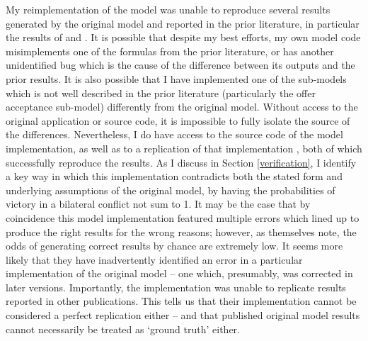 My reimplementation of the model was unable to reproduce several results generated by the original model and reported in the prior literature, in particular the results of \citet{bdm_1994} and \citet[chapter 6]{bdm_2002}. It is possible that despite my best efforts, my own model code misimplements one of the formulas from the prior literature, or has another unidentified bug which is the cause of the difference between its outputs and the prior results. It is also possible that I have implemented one of the sub-models which is not well described in the prior literature (particularly the offer acceptance sub-model) differently from the original model. Without access to the original application or source code, it is impossible to fully isolate the source of the differences. Nevertheless, I do have access to the source code of the \citet{scholz_2011} model implementation, as well as to a replication of that implementation \citep{mckibben_sanders_2014}, both of which successfully reproduce the \citet{bdm_1994} results. As I discuss in Section \ref{verification}, I identify a key way in which this implementation contradicts both the stated form and underlying assumptions of the original model, by having the probabilities of victory in a bilateral conflict not sum to 1. It may be the case that by coincidence this model implementation featured multiple errors which lined up to produce the right results for the wrong reasons; however, as \citet{scholz_2011} themselves note, the odds of generating correct results by chance are extremely low. It seems more likely that they have inadvertently identified an error in a particular implementation of the original model -- one which, presumably, was corrected in later versions. Importantly, the \citet{scholz_2011} implementation was unable to replicate results reported in other publications. This tells us that their implementation cannot be considered a perfect replication either -- and that published original model results cannot necessarily be treated as `ground truth' either.

